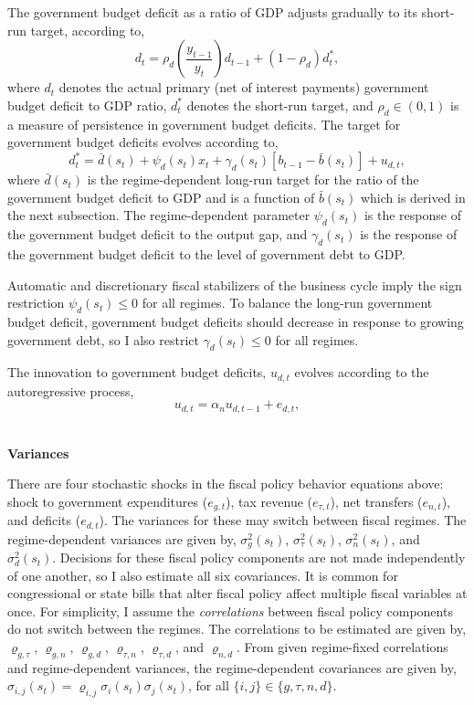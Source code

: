 \documentclass[11pt]{article}
\newcommand{\beq}{\begin{equation}}
\newcommand{\eeq}{\end{equation}}
\begin{document}
The government budget deficit as a ratio of GDP adjusts gradually to its short-run target, according to,
\beq \label{eq:deficitrat} d_t = \rho_d \left( \frac{y_{t-1}}{y_t} \right) d_{t-1} + (1-\rho_d) d_t^*, \eeq
where $d_t$ denotes the actual primary (net of interest payments) government budget deficit to GDP ratio, $d_t^*$ denotes the short-run target, and $\rho_d\in(0,1)$ is a measure of persistence in government budget deficits.  The target for government budget deficits evolves according to,
\beq \label{eq:deficittarget} d_t^* = \bar{d}(s_t) + \psi_d(s_t) x_t + \gamma_d(s_t) \left[ b_{t-1} - \bar{b}(s_t) \right] + u_{d,t}, \eeq
where $\bar{d}(s_t)$ is the regime-dependent long-run target for the ratio of the government budget deficit to GDP and is a function of $\bar{b}(s_t)$ which is derived in the next subsection.  The regime-dependent parameter $\psi_d(s_t)$ is the response of the government budget deficit to the output gap, and $\gamma_d(s_t)$ is the response of the government budget deficit to the level of government debt to GDP.  

Automatic and discretionary fiscal stabilizers of the business cycle imply the sign restriction $\psi_d(s_t) \leq 0$ for all regimes.  To balance the long-run government budget deficit, government budget deficits should decrease in response to growing government debt, so I also restrict $\gamma_d(s_t) \leq 0$ for all regimes.

The innovation to government budget deficits, $u_{d,t}$ evolves according to the autoregressive process,
\beq \label{eq:deficitarshock} u_{d,t} = \alpha_n u_{d,t-1} + e_{d,t}, \eeq

\ \\ \noindent \textbf{Variances}

\noindent There are four stochastic shocks in the fiscal policy behavior equations above: shock to government expenditures ($e_{g,t}$), tax revenue ($e_{\tau,t}$), net transfers ($e_{n,t}$), and deficits ($e_{d,t}$).  The variances for these may switch between fiscal regimes.  The regime-dependent variances are given by, $\sigma_g^2(s_t)$, $\sigma_\tau^2(s_t)$, $\sigma_n^2(s_t)$, and $\sigma_d^2(s_t)$.  Decisions for these fiscal policy components are not made independently of one another, so I also estimate all six covariances.  It is common for congressional or state bills that alter fiscal policy affect multiple fiscal variables at once.  For simplicity, I assume the \textit{correlations} between fiscal policy components do not switch between the regimes.  The correlations to be estimated are given by, $\varrho_{g,\tau}$, $\varrho_{g,n}$, $\varrho_{g,d}$, $\varrho_{\tau,n}$, $\varrho_{\tau,d}$, and $\varrho_{n,d}$.  From given regime-fixed correlations and regime-dependent variances, the regime-dependent covariances are given by, $\sigma_{i,j}(s_t) = \varrho_{i,j} \sigma_i(s_t) \sigma_j(s_t)$, for all $\{i,j\} \in \{g, \tau, n, d\}$.
\end{document}
